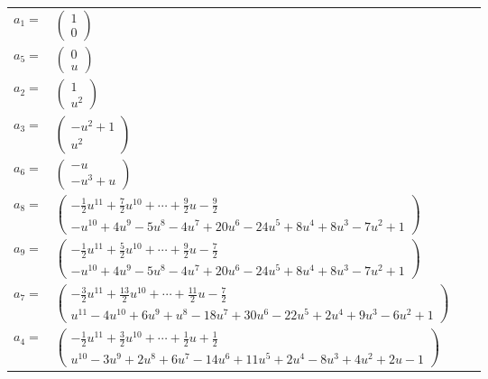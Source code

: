 \documentclass[1p]{elsarticle_modified}
\theoremstyle{definition}
\begin{document}
\begin{tabular}{m{7pt} m{180pt} m{7pt} m{180pt} }
\flushright $a_{1}=$&$\begin{pmatrix}1\\0\end{pmatrix}$ \\
\flushright $a_{5}=$&$\begin{pmatrix}0\\u\end{pmatrix}$ \\
\flushright $a_{2}=$&$\begin{pmatrix}1\\u^2\end{pmatrix}$ \\
\flushright $a_{3}=$&$\begin{pmatrix}- u^2+1\\u^2\end{pmatrix}$ \\
\flushright $a_{6}=$&$\begin{pmatrix}- u\\- u^3+u\end{pmatrix}$ \\
\flushright $a_{8}=$&$\begin{pmatrix}-\frac{1}{2} u^{11}+\frac{7}{2} u^{10}+\cdots+\frac{9}{2} u-\frac{9}{2}\\- u^{10}+4 u^9-5 u^8-4 u^7+20 u^6-24 u^5+8 u^4+8 u^3-7 u^2+1\end{pmatrix}$ \\
\flushright $a_{9}=$&$\begin{pmatrix}-\frac{1}{2} u^{11}+\frac{5}{2} u^{10}+\cdots+\frac{9}{2} u-\frac{7}{2}\\- u^{10}+4 u^9-5 u^8-4 u^7+20 u^6-24 u^5+8 u^4+8 u^3-7 u^2+1\end{pmatrix}$ \\
\flushright $a_{7}=$&$\begin{pmatrix}-\frac{3}{2} u^{11}+\frac{13}{2} u^{10}+\cdots+\frac{11}{2} u-\frac{7}{2}\\u^{11}-4 u^{10}+6 u^9+u^8-18 u^7+30 u^6-22 u^5+2 u^4+9 u^3-6 u^2+1\end{pmatrix}$ \\
\flushright $a_{4}=$&$\begin{pmatrix}-\frac{1}{2} u^{11}+\frac{3}{2} u^{10}+\cdots+\frac{1}{2} u+\frac{1}{2}\\u^{10}-3 u^9+2 u^8+6 u^7-14 u^6+11 u^5+2 u^4-8 u^3+4 u^2+2 u-1\end{pmatrix}$ \\

\end{tabular}
\end{document}
